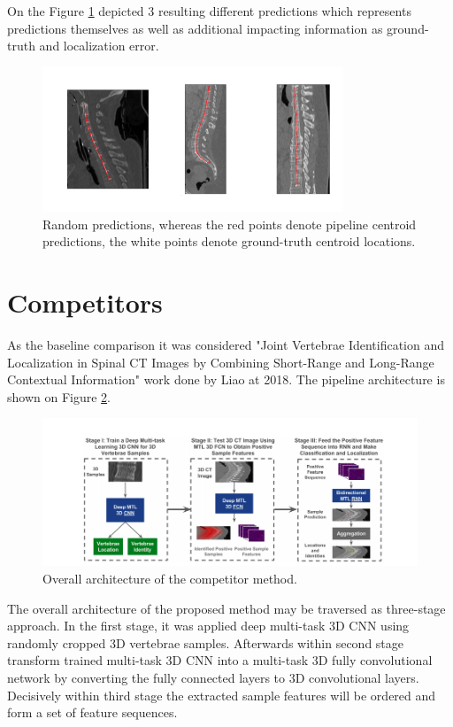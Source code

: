 On the Figure \ref{fig:predictions} depicted 3 resulting different predictions which represents predictions themselves as well as additional impacting information as ground-truth and localization error. 
\begin{figure}[h]
    \centering \includegraphics[width=9cm]{images/predictions.png}
    \caption {Random predictions, whereas the red points denote pipeline centroid predictions, the white points denote ground-truth centroid locations.}
    \label{fig:predictions}
\end{figure}

\newpage
\section{Competitors}
As the baseline comparison it was considered "Joint Vertebrae Identification and Localization in Spinal CT Images by Combining Short-Range and Long-Range Contextual Information" work \cite{Liao2018} done by Liao at 2018. The pipeline architecture is shown on Figure \ref{fig:competitor}.

\begin{figure}[h]
    \centering \includegraphics[width=12cm]{images/competitor.png}
    \caption {Overall architecture of the competitor method.}
    \label{fig:competitor}
\end{figure}

The overall architecture of the proposed method may be traversed as three-stage approach. In the first stage, it was applied deep multi-task 3D CNN using randomly cropped 3D vertebrae samples. Afterwards within second stage transform trained multi-task 3D CNN into a multi-task 3D fully convolutional network by converting the fully connected layers to 3D convolutional layers. Decisively within third stage the extracted sample features will be ordered and form a set of feature sequences. 

